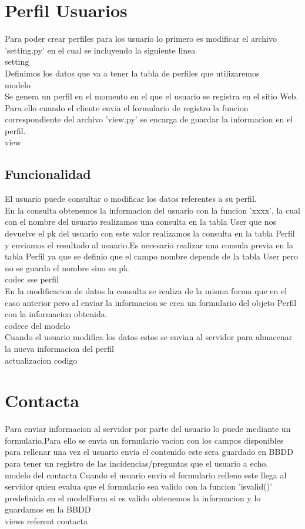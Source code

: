 \section{Perfil Usuarios}
Para poder crear perfiles para los usuario lo primero es modificar el archivo 'setting.py' en el cual se incluyendo la siguiente linea
\\setting 
\\Definimos los datos que va a tener la tabla de perfiles que utilizaremos
\\modelo
\\Se genera un perfil en el momento en el que el usuario se registra en el sitio Web. Para ello cuando el cliente envia el formulario de registro la funcion correspondiente del archivo 'view.py' se encarga de guardar la informacion en el perfil.
\\view
\subsection{Funcionalidad}
El usuario  puede consultar o modificar los datos referentes a su perfil.
\\ En la consulta obtenemos la informacion del usuario con la funcion 'xxxx', la cual con el nombre del usuario realizamos una consulta en la tabla User que nos devuelve el pk del usuario con este valor realizamos la consulta en la tabla Perfil y enviamos el resultado al usuario.Es necesario realizar una consula previa en la tabla Perfil ya que se definio que el campo nombre depende de la tabla User pero no se guarda el nombre sino su pk.
\\codec sse perfil
\\En la modificacion de datos la consulta se realiza de la misma forma que en el caso anterior pero al enviar la informacion se crea un formulario del objeto Perfil con la informacion obtenida.
\\ codece del modelo
\\Cuando el usuario modifica los datos estos se envian al servidor para almacenar la nueva informacion del perfil
\\ actualizacion codigo
\section{Contacta}
Para enviar informacion al servidor por parte del usuario lo puede mediante un formulario.Para ello se envia un formulario vacion con los campos disponibles para rellenar una vez el usuario envia el contenido este sera guardado en BBDD para tener un registro de las incidencias/preguntas que el usuario a echo.
\\modelo del contacta
Cuando el usuario envia el formulario relleno este llega al servidor quien evalua que el formulario sea valido con  la funcion 'isvalid()' predefinida en el modelForm si es valido obtenemos la informacion y lo guardamos en la BBDD
\\views referent contacta








